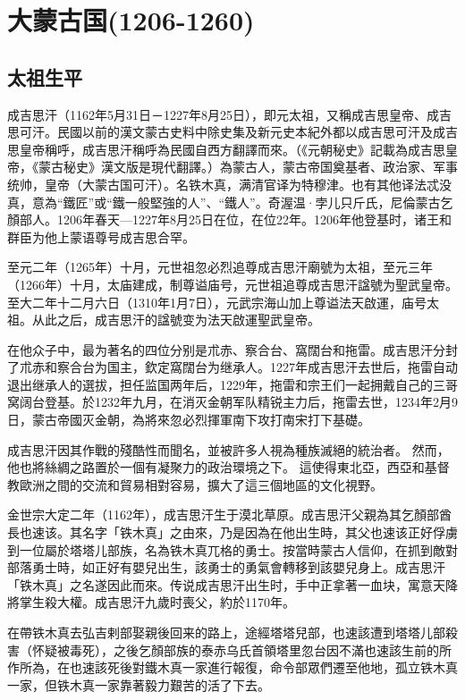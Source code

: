 
\section{大蒙古国\tiny(1206-1260)}


\subsection{太祖生平}


成吉思汗（1162年5月31日－1227年8月25日），即元太祖，又稱成吉思皇帝、成吉思可汗。民國以前的漢文蒙古史料中除史集及新元史本紀外都以成吉思可汗及成吉思皇帝稱呼，成吉思汗稱呼為民國自西方翻譯而來。（《元朝秘史》記載為成吉思皇帝，《蒙古秘史》漢文版是現代翻譯。）為蒙古人，蒙古帝国奠基者、政治家、军事统帅，皇帝（大蒙古国可汗）。名铁木真，满清官译为特穆津。也有其他译法忒没真，意為“鐵匠”或“鐵一般堅強的人”、“鐵人”。奇渥温·孛儿只斤氏，尼倫蒙古乞顏部人。1206年春天—1227年8月25日在位，在位22年。1206年他登基时，诸王和群臣为他上蒙语尊号成吉思合罕。

至元二年（1265年）十月，元世祖忽必烈追尊成吉思汗廟號为太祖，至元三年（1266年）十月，太庙建成，制尊谥庙号，元世祖追尊成吉思汗諡號为聖武皇帝。至大二年十二月六日（1310年1月7日），元武宗海山加上尊谥法天啟運，庙号太祖。从此之后，成吉思汗的諡號变为法天啟運聖武皇帝。 

在他众子中，最为著名的四位分别是朮赤、察合台、窩闊台和拖雷。成吉思汗分封了朮赤和察合台为国主，欽定窩闊台为继承人。1227年成吉思汗去世后，拖雷自动退出继承人的選拔，担任监国两年后，1229年，拖雷和宗王们一起拥戴自己的三哥窝阔台登基。於1232年九月，在消灭金朝军队精锐主力后，拖雷去世，1234年2月9日，蒙古帝國灭金朝，為將來忽必烈揮軍南下攻打南宋打下基礎。

成吉思汗因其作戰的殘酷性而聞名，並被許多人視為種族滅絕的統治者。 然而，他也將絲綢之路置於一個有凝聚力的政治環境之下。 這使得東北亞，西亞和基督教歐洲之間的交流和貿易相對容易，擴大了這三個地區的文化視野。

金世宗大定二年（1162年），成吉思汗生于漠北草原。成吉思汗父親為其乞顏部酋長也速该。其名字「铁木真」之由來，乃是因為在他出生時，其父也速该正好俘虜到一位屬於塔塔儿部族，名為铁木真兀格的勇士。按當時蒙古人信仰，在抓到敵對部落勇士時，如正好有嬰兒出生，該勇士的勇氣會轉移到該嬰兒身上。成吉思汗「铁木真」之名遂因此而來。传说成吉思汗出生时，手中正拿著一血块，寓意天降將掌生殺大權。成吉思汗九歲时喪父，約於1170年。

在帶铁木真去弘吉剌部娶親後回来的路上，途經塔塔兒部，也速該遭到塔塔儿部殺害（怀疑被毒死），之後乞顏部族的泰赤乌氏首領塔里忽台因不滿也速該生前的所作所為，在也速該死後對鐵木真一家進行報復，命令部眾們遷至他地，孤立铁木真一家，但铁木真一家靠著毅力艱苦的活了下去。

